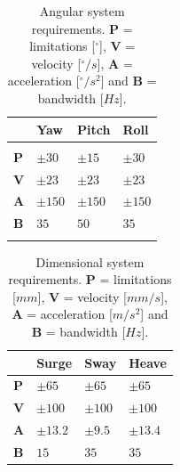 \documentclass[10.5pt, twocolumn]{article}
\begin{document}
\begin{table}[h]
\centering
\begin{tabular}{C{0.5cm}C{1.3cm}C{1.3cm}C{1.3cm}}
	& \textbf{Yaw} & \textbf{Pitch} & \textbf{Roll} \\
	\hline
	\hline
	\\
	\textbf{P} & \( \pm 30 \) & \( \pm 15 \) & \( \pm 30 \) \\
	\textbf{V} & \( \pm 23 \) & \( \pm 23 \) & \( \pm 23 \) \\
	\textbf{A} & \( \pm 150 \) & \( \pm 150 \) & \( \pm 150 \) \\
	\textbf{B} & \( 35 \) & \( 50 \) & \( 35 \) \\
	\\
	\hline
\end{tabular}
\caption{Angular system requirements. \textbf{P} = limitations [\( ^\circ \)], \textbf{V} = velocity [\( ^\circ/s \)], \textbf{A} = acceleration [\( ^\circ/s^2 \)] and \textbf{B} = bandwidth [\( Hz \)].}
\label{t:SystemRequirements1}
\end{table}
\begin{table}[h]
\centering
\begin{tabular}{C{0.5cm}C{1.3cm}C{1.3cm}C{1.3cm}}
	& \textbf{Surge} & \textbf{Sway} & \textbf{Heave}\\
	\hline
	\hline
	\vspace{0.05cm}\textbf{P} & \vspace{0.05cm}\( \pm 65 \) & \vspace{0.05cm}\( \pm 65 \) & \vspace{0.05cm}\( \pm 65 \) \\
	\textbf{V} & \( \pm 100 \) & \( \pm 100 \) & \( \pm 100 \) \\
	\textbf{A} & \( \pm 13.2 \) & \( \pm 9.5 \) & \( \pm 13.4 \) \\
	\textbf{B} & \( 15 \) & \( 35 \) & \( 35 \)
	\vspace{0.15cm} \\
	\hline
\end{tabular}
\caption{Dimensional system requirements. \textbf{P} = limitations [\( mm \)], \textbf{V} = velocity [\( mm/s \)], \textbf{A} = acceleration [\( m/s^2 \)] and \textbf{B} = bandwidth [\( Hz \)].}
\label{t:SystemRequirements2}
\end{table}
\end{document}
